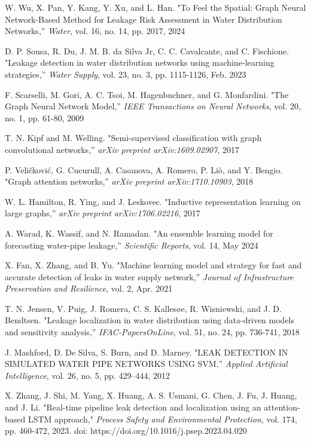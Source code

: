 \begin{thebibliography}{99}
W. Wu, X. Pan, Y. Kang, Y. Xu, and L. Han. "To Feel the Spatial: Graph Neural Network-Based Method for Leakage Risk Assessment in Water Distribution Networks,'' \textit{Water}, vol. 16, no. 14, pp. 2017, 2024

D. P. Sousa, R. Du, J. M. B. da Silva Jr, C. C. Cavalcante, and C. Fischione. "Leakage detection in water distribution networks using machine-learning strategies,'' \textit{Water Supply}, vol. 23, no. 3, pp. 1115-1126, Feb. 2023

F. Scarselli, M. Gori, A. C. Tsoi, M. Hagenbuchner, and G. Monfardini. "The Graph Neural Network Model,'' \textit{IEEE Transactions on Neural Networks}, vol. 20, no. 1, pp. 61-80, 2009

T. N. Kipf and M. Welling. "Semi-supervised classification with graph convolutional networks,'' \textit{arXiv preprint arXiv:1609.02907}, 2017

P. Veličković, G. Cucurull, A. Casanova, A. Romero, P. Liò, and Y. Bengio. "Graph attention networks,'' \textit{arXiv preprint arXiv:1710.10903}, 2018

W. L. Hamilton, R. Ying, and J. Leskovec. "Inductive representation learning on large graphs,'' \textit{arXiv preprint arXiv:1706.02216}, 2017

A. Warad, K. Wassif, and N. Ramadan. "An ensemble learning model for forecasting water-pipe leakage,'' \textit{Scientific Reports}, vol. 14, May 2024

X. Fan, X. Zhang, and B. Yu. "Machine learning model and strategy for fast and accurate detection of leaks in water supply network,'' \textit{Journal of Infrastructure Preservation and Resilience}, vol. 2, Apr. 2021

T. N. Jensen, V. Puig, J. Romera, C. S. Kallesøe, R. Wisniewski, and J. D. Bendtsen. "Leakage localization in water distribution using data-driven models and sensitivity analysis,'' \textit{IFAC-PapersOnLine}, vol. 51, no. 24, pp. 736-741, 2018

J. Mashford, D. De Silva, S. Burn, and D. Marney. "LEAK DETECTION IN SIMULATED WATER PIPE NETWORKS USING SVM,'' \textit{Applied Artificial Intelligence}, vol. 26, no. 5, pp. 429--444, 2012

X. Zhang, J. Shi, M. Yang, X. Huang, A. S. Usmani, G. Chen, J. Fu, J. Huang, and J. Li. "Real-time pipeline leak detection and localization using an attention-based LSTM approach," \textit{Process Safety and Environmental Protection}, vol. 174, pp. 460-472, 2023. doi: https://doi.org/10.1016/j.psep.2023.04.020


\end{thebibliography}
